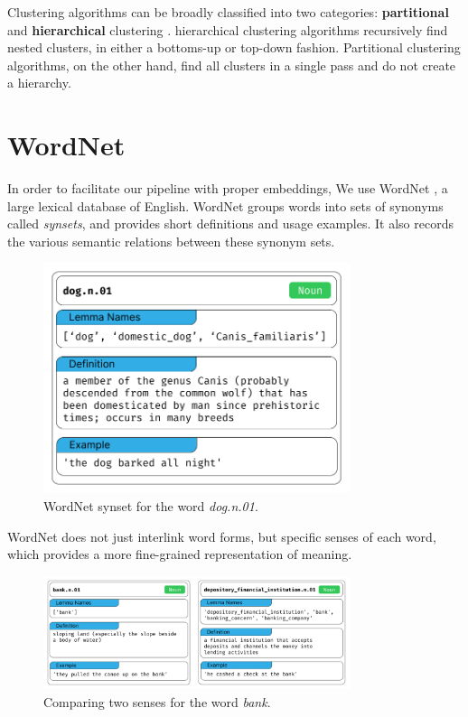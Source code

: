 Clustering algorithms can be broadly classified into two categories: \textbf{partitional} and \textbf{hierarchical} clustering \cite{jainDataClustering502010}. 
hierarchical clustering algorithms recursively find nested clusters, in either a bottoms-up or top-down fashion. Partitional clustering algorithms, on the other hand,
find all clusters in a single pass and do not create a hierarchy.

\section{WordNet}
In order to facilitate our pipeline with proper embeddings, We use WordNet \cite{millerWordNetLexicalDatabase1994}, a large lexical database of English.
WordNet groups words into sets of synonyms called \textit{synsets}, and provides short definitions and usage examples. It also records the
various semantic relations between these synonym sets.

\begin{figure}
    \centering
    \includegraphics[width=0.8\textwidth]{figures/wordnet_single_synset.png}
    \caption{WordNet synset for the word \textit{dog.n.01}.}
    \label{fig:wordnet_single_synset}
\end{figure}

WordNet does not just interlink word forms, but specific senses of each word, which provides a more fine-grained representation of meaning.

\begin{figure}
    \centering
    \includegraphics[width=0.8\textwidth]{figures/wordnet_multiple_synset.png}
    \caption{Comparing two senses for the word \textit{bank}.}
    \label{fig:wordnet_multiple_synset}
\end{figure}



